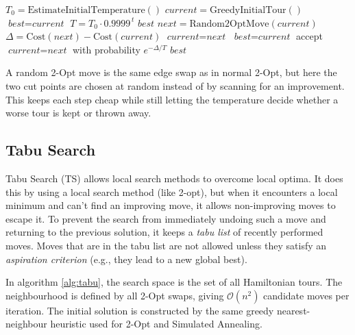 \begin{algorithm}[H]
	\caption{Simulated Annealing}
	\label{alg:sa}
	\begin{algorithmic}[1]
		\STATE $T_0 = \text{EstimateInitialTemperature}()$
		\STATE $\textit{current} = \text{GreedyInitialTour}()$
		\STATE $\textit{best} = \textit{current}$
		\STATE $T = T_0 \cdot 0.9999^{\,t}$
		\RETURN $\textit{best}$
		\ENDIF
		\STATE $\textit{next} = \text{Random2OptMove}(\textit{current})$
		\STATE $\Delta = \text{Cost}(\textit{next}) - \text{Cost}(\textit{current})$
		\STATE $\textit{current} = \textit{next}$
		\STATE $\textit{best} = \textit{current}$
		\ENDIF
		\ELSE
		\STATE accept $\textit{current} = \textit{next}$ with probability $e^{-\Delta / T}$
		\ENDIF
		\ENDFOR
		\RETURN $\textit{best}$
	\end{algorithmic}
\end{algorithm}

A random 2-Opt move is the same edge swap as in normal 2-Opt, but here the two cut points are chosen at random instead of by scanning for an improvement.
This keeps each step cheap while still letting the temperature decide whether a worse tour is kept or thrown away.






\subsection{Tabu Search}\label{subsec:tabu-search}

Tabu Search (TS) allows local search methods to overcome local optima.
It does this by using a local search method (like 2-opt), but when it encounters a local minimum and can't find an improving move, it allows non-improving moves to escape it.
To prevent the search from immediately undoing such a move and returning to the previous solution,
it keeps a \textit{tabu list} of recently performed moves.
Moves that are in the tabu list are not allowed unless they satisfy an \emph{aspiration criterion} (e.g., they lead to a new global best).

In algorithm \ref{alg:tabu}, the search space is the set of all Hamiltonian tours.
The neighbourhood is defined by all 2-Opt swaps, giving $\mathcal{O}(n^2)$ candidate moves per iteration.
The initial solution is constructed by the same greedy nearest-neighbour heuristic used for 2-Opt and Simulated Annealing.


